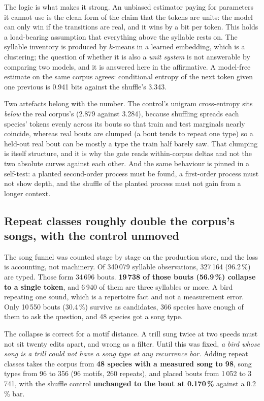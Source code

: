 \documentclass[10pt,twocolumn,a4paper]{article}
\begin{document}
The logic is what makes it strong. An unbiased estimator paying for parameters it cannot use
is the clean form of the claim that the tokens are units: the model can only win if the
transitions are real, and it wins by a bit per token. This holds a load-bearing assumption
that everything above the syllable rests on. The syllable inventory is produced by $k$-means
in a learned embedding, which is a clustering; the question of whether it is also a
\emph{unit system} is not answerable by comparing two models, and it is answered here in the
affirmative. A model-free estimate on the same corpus agrees: conditional entropy of the next
token given one previous is 0.941 bits against the shuffle's 3.343.

Two artefacts belong with the number. The control's unigram cross-entropy sits \emph{below}
the real corpus's (2.879 against 3.284), because shuffling spreads each species' tokens
evenly across its bouts so that train and test marginals nearly coincide, whereas real bouts
are clumped (a bout tends to repeat one type) so a held-out real bout can be mostly a
type the train half barely saw. That clumping is itself structure, and it is why the gate
reads within-corpus deltas and not the two absolute curves against each other. And the
same behaviour is pinned in a self-test: a planted second-order process must be found, a
first-order process must not show depth, and the shuffle of the planted process must not gain
from a longer context.

\subsection{Repeat classes roughly double the corpus's songs, with the control unmoved}

The song funnel was counted stage by stage on the production store, and the loss is
accounting, not machinery. Of 340\,079 syllable observations, 327\,164 (96.2\,\%) are
typed. Those form 34\,696 bouts. \textbf{19\,738 of those bouts (56.9\,\%) collapse to a
single token}, and 6\,940 of them are three syllables or more. A bird repeating one sound,
which is a repertoire fact and not a measurement error. Only 10\,550 bouts (30.4\,\%) survive
as candidates, 366 species have enough of them to ask the question, and 48 species got a song
type.

The collapse is correct for a motif distance. A trill sung twice at two speeds must not
sit twenty edits apart, and wrong as a filter. Until this was fixed, \emph{a bird whose
song is a trill could not have a song type at any recurrence bar.} Adding repeat classes takes
the corpus from \textbf{48 species with a measured song to 98}, song types from 96 to 356
(96 motifs, 260 repeats), and placed bouts from 1\,052 to 3\,741, with the shuffle control
\textbf{unchanged to the bout at 0.170\,\%} against a 0.2\,\% bar.
\end{document}
